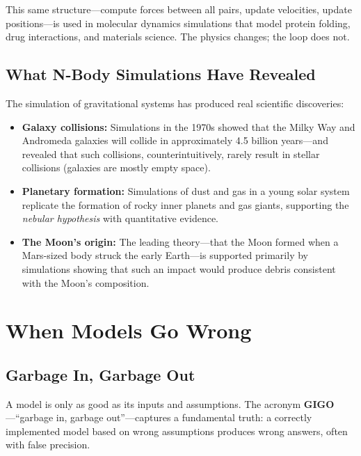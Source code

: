 \documentclass[11pt,letterpaper]{article}
\newcommand{\keyterm}[1]{\textbf{\textcolor{cssecondary}{#1}}}
\begin{document}
This same structure---compute forces between all pairs, update velocities, update positions---is used in molecular dynamics simulations that model protein folding, drug interactions, and materials science. The physics changes; the loop does not.

\subsection{What N-Body Simulations Have Revealed}

The simulation of gravitational systems has produced real scientific discoveries:

\begin{itemize}[itemsep=4pt]
    \item \textbf{Galaxy collisions:} Simulations in the 1970s showed that the Milky Way and Andromeda galaxies will collide in approximately 4.5 billion years---and revealed that such collisions, counterintuitively, rarely result in stellar collisions (galaxies are mostly empty space).

    \item \textbf{Planetary formation:} Simulations of dust and gas in a young solar system replicate the formation of rocky inner planets and gas giants, supporting the \textit{nebular hypothesis} with quantitative evidence.

    \item \textbf{The Moon's origin:} The leading theory---that the Moon formed when a Mars-sized body struck the early Earth---is supported primarily by simulations showing that such an impact would produce debris consistent with the Moon's composition.
\end{itemize}

\section{When Models Go Wrong}

\subsection{Garbage In, Garbage Out}

A model is only as good as its inputs and assumptions. The acronym \keyterm{GIGO}---``garbage in, garbage out''---captures a fundamental truth: a correctly implemented model based on wrong assumptions produces wrong answers, often with false precision.
\end{document}
